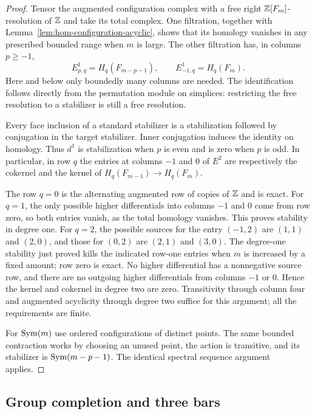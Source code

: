 \begin{proof}
Tensor the augmented configuration complex with a free right
$\mathbb Z[F_m]$-resolution of $\mathbb Z$ and take its total complex.  One filtration,
together with Lemma~\ref{lem:hom-configuration-acyclic}, shows that its
homology vanishes in any prescribed bounded range when $m$ is large.
The other filtration has, in columns $p\geq-1$,
\begin{equation}\label{eq:hom-configuration-ss}
 E^1_{p,q}=H_q(F_{m-p-1}),\qquad
 E^1_{-1,q}=H_q(F_m).
\end{equation}
Here and below only boundedly many columns are needed.  The identification
follows directly from the permutation module on simplices: restricting the
free resolution to a stabilizer is still a free resolution.

Every face inclusion of a standard stabilizer is a stabilization followed
by conjugation in the target stabilizer.  Inner conjugation induces the
identity on homology.  Thus $d^1$ is stabilization when $p$ is even and is
zero when $p$ is odd.  In particular, in row $q$ the entries at columns
$-1$ and $0$ of $E^2$ are respectively the cokernel and the kernel of
$H_q(F_{m-1})\to H_q(F_m)$.

The row $q=0$ is the alternating augmented row of copies of $\mathbb Z$ and is
exact.  For $q=1$, the only possible higher differentials into columns
$-1$ and $0$ come from row zero, so both entries vanish, as the total
homology vanishes.  This proves stability in degree one.  For $q=2$, the
possible sources for the entry $(-1,2)$ are $(1,1)$ and $(2,0)$, and those
for $(0,2)$ are $(2,1)$ and $(3,0)$.  The degree-one stability just proved
kills the indicated row-one entries when $m$ is increased by a fixed
amount; row zero is exact.  No higher differential has a nonnegative
source row, and there are no outgoing higher differentials from columns
$-1$ or $0$.  Hence the kernel and cokernel in degree two are zero.
Transitivity through column four and augmented acyclicity through degree
two suffice for this argument; all the requirements are finite.

For $\operatorname{Sym}(m)$ use ordered configurations of distinct points.  The same
bounded contraction works by choosing an unused point, the action is
transitive, and its stabilizer is $\operatorname{Sym}(m-p-1)$.  The identical spectral
sequence argument applies.
\end{proof}

\subsection{Group completion and three bars}


